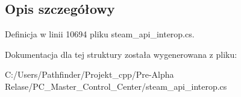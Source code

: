 \subsection{Opis szczegółowy}


Definicja w linii 10694 pliku steam\+\_\+api\+\_\+interop.\+cs.



Dokumentacja dla tej struktury została wygenerowana z pliku\+:\begin{DoxyCompactItemize}
\item 
C\+:/\+Users/\+Pathfinder/\+Projekt\+\_\+cpp/\+Pre-\/\+Alpha Relase/\+P\+C\+\_\+\+Master\+\_\+\+Control\+\_\+\+Center/steam\+\_\+api\+\_\+interop.\+cs\end{DoxyCompactItemize}

